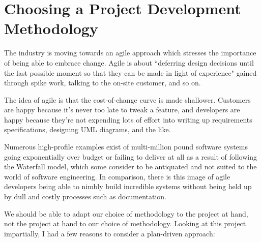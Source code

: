 \chapter{Choosing a Project Development Methodology}\label{appendix:methodology}

The industry is moving towards an agile approach which stresses the importance of being able to embrace change. Agile is about ``deferring design decisions until the last possible moment so that they can be made in light of experience" gained through spike work, talking to the on-site customer, and so on.

The idea of agile is that the cost-of-change curve is made shallower. Customers are happy because it's never too late to tweak a feature, and developers are happy because they're not expending lots of effort into writing up requirements specifications, designing UML diagrams, and the like.

Numerous high-profile examples exist of multi-million pound software systems going exponentially over budget or failing to deliver at all as a result of following the Waterfall model, which some consider to be antiquated and not suited to the world of software engineering. In comparison, there is this image of agile developers being able to nimbly build incredible systems without being held up by dull and costly processes such as documentation.

We should be able to adapt our choice of methodology to the project at hand, not the project at hand to our choice of methodology. Looking at this project impartially, I had a few reasons to consider a plan-driven approach:

